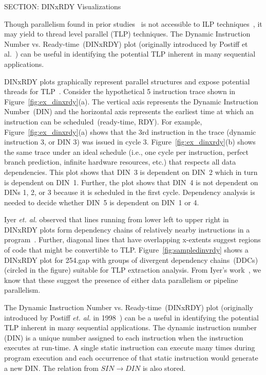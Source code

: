 {SECTION: DINxRDY Visualizations


Though parallelism found in prior studies~\cite{lam:92:isca, wall:93:decwrl, austin:92:isca} is not accessible to ILP techniques~\cite{wall:93:decwrl}, it may yield to thread level parallel (TLP) techniques.  The Dynamic Instruction Number vs. Ready-time~(DINxRDY) plot (originally introduced by Postiff et al.~\cite{postiff:98:um}) can be useful in identifying the potential TLP inherent in many sequential applications.

DINxRDY plots graphically represent parallel structures and expose potential threads for TLP~\cite{iyer:05:epic}.  Consider the hypothetical 5 instruction trace shown in Figure~\ref{fig:ex_dinxrdy}(a).  The vertical axis represents the Dynamic Instruction Number~(DIN) and the horizontal axis represents the earliest time at which an instruction can be scheduled~(ready-time, RDY).  For example, Figure~\ref{fig:ex_dinxrdy}(a) shows that the 3rd instruction in the trace (dynamic instruction 3, or DIN 3) was issued in cycle 3. Figure~\ref{fig:ex_dinxrdy}(b) shows the same trace under an ideal schedule (i.e., one cycle per instruction, perfect branch prediction, infinite hardware resources, etc.) that respects all data dependencies.  This plot shows that DIN~3 is dependent on DIN~2 which in turn is dependent on DIN~1.  Further, the plot shows that DIN~4 is not dependent on DINs 1, 2, or 3 because it is scheduled in the first cycle.  Dependency analysis is needed to decide whether DIN~5 is dependent on DIN~1 or 4.

Iyer \textit{et. al.} observed that lines running from lower left to upper right in DINxRDY plots form dependency chains of relatively nearby instructions in a program~\cite{iyer:05:epic}.  Further, diagonal lines that have overlapping x-extents suggest regions of code that might be convertible to TLP. Figure~\ref{fig:sampledinvrdy} shows a DINxRDY plot for 254.gap with groups of divergent dependency chains~(DDCs) (circled in the figure) suitable for TLP extraction analysis. From Iyer's work~\cite{iyer:05:epic}, we know that these suggest the presence of either data parallelism or pipeline parallelism.

The Dynamic Instruction Number vs. Ready-time~(DINxRDY) plot (originally introduced by Postiff \textit{et. al.} in 1998~\cite{postiff:98:um}) can be a useful in identifying the potential TLP inherent in many sequential applications.  The dynamic instruction number (DIN) is a unique number assigned to each instruction when the instruction executes at run-time.  A single static instruction can execute many times during program execution and each occurrence of that static instruction would generate a new DIN.  The relation from $SIN \rightarrow DIN$ is also stored.

}
